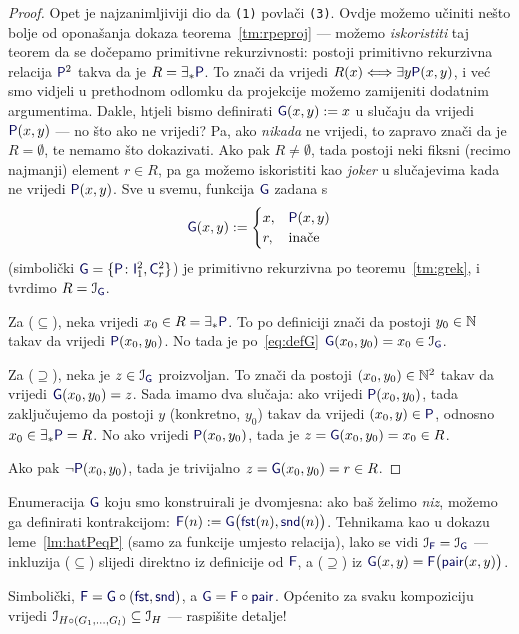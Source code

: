 \begin{proof}
Opet je najzanimljiviji dio da \texttt{(1)} povlači \texttt{(3)}. %
Ovdje možemo učiniti nešto bolje od oponašanja dokaza teorema~\ref{tm:rpeproj} --- možemo \emph{iskoristiti} taj teorem da se dočepamo primitivne rekurzivnosti: postoji primitivno rekurzivna relacija $\f P^2$ takva da je $R=\exists_*\f P$. To znači da vrijedi $R(x)\Longleftrightarrow\exists y\f P(x,y)$, i već smo vidjeli u prethodnom odlomku da projekcije možemo zamijeniti dodatnim argumentima. Dakle, htjeli bismo definirati $\f G(x,y):=x$ u slučaju da vrijedi $\f P(x,y)$ --- no što ako ne vrijedi? Pa, ako \emph{nikada} ne vrijedi, to zapravo znači da je $R=\emptyset$, te nemamo što dokazivati. Ako pak $R\ne\emptyset$, tada postoji neki fiksni (recimo najmanji) element $r\in R$, pa ga možemo iskoristiti kao \emph{joker} u slučajevima kada ne vrijedi $\f P(x,y)$. Sve u svemu, funkcija $\f G$ zadana s
\begin{equation}\label{eq:defG}
    \f G(x,y):=\begin{cases}
        x,&\f P(x,y)\\
        r,&\text{inače}
    \end{cases}
\end{equation}
(simbolički $\f G=\{\f P\colon\f I_1^2,\f C_r^2\}$) je primitivno rekurzivna po teoremu~\ref{tm:grek}, i tvrdimo $R=\im{\f G}$.

Za ($\subseteq$), neka vrijedi $x_0\in R=\exists_*\f P$. To po definiciji znači da postoji $y_0\in{\mathbb N}$ takav da vrijedi $\f P(x_0,y_0)$. No tada je po~\eqref{eq:defG} $\f G(x_0,y_0)=x_0\in\im{\f G}$.

Za ($\supseteq$), neka je $z\in\im{\f G}$ proizvoljan. To znači da postoji $(x_0,y_0)\in{\mathbb N}^2$ takav da vrijedi $\f G(x_0,y_0)=z$. Sada imamo dva slučaja: ako vrijedi $\f P(x_0,y_0)$, tada zaključujemo da postoji $y$ (konkretno, $y_0$) takav da vrijedi $(x_0,y)\in\f P$, odnosno $x_0\in\exists_*\f P=R$. No ako vrijedi $\f P(x_0,y_0)$, tada je $z=\f G(x_0,y_0)=x_0\in R$.

Ako pak $\lnot\f P(x_0,y_0)$, tada je trivijalno $z=\f G(x_0,y_0)=r\in R$.
\end{proof}

\begin{napomena}[{name=[enumeracija kao jednomjesna funkcija --- niz]}]
Enumeracija $\f G$ koju smo konstruirali je dvomjesna: ako baš želimo \emph{niz}, možemo ga definirati kontrakcijom: $\f F(n):=\f G\bigl(\f{fst}(n),\f{snd}(n)\bigr)$. Tehnikama kao u dokazu leme~\ref{lm:hatPeqP} (samo za funkcije umjesto relacija), lako se vidi $\im{\f F}=\im{\f G}$ --- inkluzija ($\subseteq$) slijedi direktno iz definicije od $\f F$, a ($\supseteq$) iz $\f G(x,y)=\f F\bigl(\f{pair}(x,y)\bigr)$.

Simbolički, $\f F=\f G\circ(\f{fst},\f{snd})$, a $\f G=\f F\circ\f{pair}$. Općenito za svaku kompoziciju vrijedi $\mathcal I_{H\circ(G_1,\dotsc,G_l)}\subseteq\mathcal I_{H}$ --- raspišite detalje!
\end{napomena}

